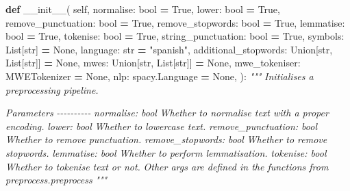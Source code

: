 \documentclass[
  spanish,
]{article}
\newenvironment{Shaded}{\begin{snugshade}}{\end{snugshade}}
\newcommand{\BuiltInTok}[1]{#1}
\newcommand{\CommentTok}[1]{\textcolor[rgb]{0.56,0.35,0.01}{\textit{#1}}}
\newcommand{\FunctionTok}[1]{\textcolor[rgb]{0.00,0.00,0.00}{#1}}
\newcommand{\KeywordTok}[1]{\textcolor[rgb]{0.13,0.29,0.53}{\textbf{#1}}}
\newcommand{\NormalTok}[1]{#1}
\newcommand{\OperatorTok}[1]{\textcolor[rgb]{0.81,0.36,0.00}{\textbf{#1}}}
\newcommand{\StringTok}[1]{\textcolor[rgb]{0.31,0.60,0.02}{#1}}
\newcommand{\VariableTok}[1]{\textcolor[rgb]{0.00,0.00,0.00}{#1}}
\begin{document}
\begin{Shaded}
\begin{Highlighting}[]
\KeywordTok{def} \FunctionTok{\_\_init\_\_}\NormalTok{(}
    \VariableTok{self}\NormalTok{,}
\NormalTok{    normalise: }\BuiltInTok{bool} \OperatorTok{=} \VariableTok{True}\NormalTok{,}
\NormalTok{    lower: }\BuiltInTok{bool} \OperatorTok{=} \VariableTok{True}\NormalTok{,}
\NormalTok{    remove\_punctuation: }\BuiltInTok{bool} \OperatorTok{=} \VariableTok{True}\NormalTok{,}
\NormalTok{    remove\_stopwords: }\BuiltInTok{bool} \OperatorTok{=} \VariableTok{True}\NormalTok{,}
\NormalTok{    lemmatise: }\BuiltInTok{bool} \OperatorTok{=} \VariableTok{True}\NormalTok{,}
\NormalTok{    tokenise: }\BuiltInTok{bool} \OperatorTok{=} \VariableTok{True}\NormalTok{,}
\NormalTok{    string\_punctuation: }\BuiltInTok{bool} \OperatorTok{=} \VariableTok{True}\NormalTok{,}
\NormalTok{    symbols: List[}\BuiltInTok{str}\NormalTok{] }\OperatorTok{=} \VariableTok{None}\NormalTok{,}
\NormalTok{    language: }\BuiltInTok{str} \OperatorTok{=} \StringTok{"spanish"}\NormalTok{,}
\NormalTok{    additional\_stopwords: Union[}\BuiltInTok{str}\NormalTok{, List[}\BuiltInTok{str}\NormalTok{]] }\OperatorTok{=} \VariableTok{None}\NormalTok{,}
\NormalTok{    mwes: Union[}\BuiltInTok{str}\NormalTok{, List[}\BuiltInTok{str}\NormalTok{]] }\OperatorTok{=} \VariableTok{None}\NormalTok{,}
\NormalTok{    mwe\_tokeniser: MWETokenizer }\OperatorTok{=} \VariableTok{None}\NormalTok{,}
\NormalTok{    nlp: spacy.Language }\OperatorTok{=} \VariableTok{None}\NormalTok{,}
\NormalTok{):}
    \CommentTok{"""}
\CommentTok{    Initialises a preprocessing pipeline.}

\CommentTok{    Parameters}
\CommentTok{    {-}{-}{-}{-}{-}{-}{-}{-}{-}{-}}
\CommentTok{    normalise: bool}
\CommentTok{        Whether to normalise text with a proper encoding.}
\CommentTok{    lower: bool}
\CommentTok{        Whether to lowercase text.}
\CommentTok{    remove\_punctuation: bool}
\CommentTok{        Whether to remove punctuation.}
\CommentTok{    remove\_stopwords: bool}
\CommentTok{        Whether to remove stopwords.}
\CommentTok{    lemmatise: bool}
\CommentTok{        Whether to perform lemmatisation.}
\CommentTok{    tokenise: bool}
\CommentTok{        Whether to tokenise text or not.}
\CommentTok{    Other args are defined in the functions from \textasciigrave{}preprocess.preprocess\textasciigrave{}}
\CommentTok{    """}
\end{Highlighting}
\end{Shaded}
\end{document}
